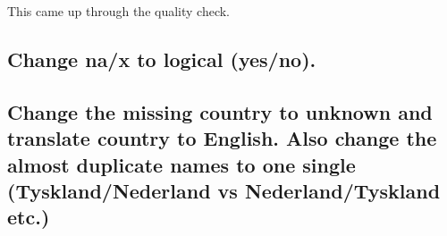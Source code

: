 \documentclass[]{article}
\newenvironment{Shaded}{\begin{snugshade}}{\end{snugshade}}
\newcommand{\CommentTok}[1]{\textcolor[rgb]{0.56,0.35,0.01}{\textit{#1}}}
\newcommand{\DataTypeTok}[1]{\textcolor[rgb]{0.13,0.29,0.53}{#1}}
\newcommand{\KeywordTok}[1]{\textcolor[rgb]{0.13,0.29,0.53}{\textbf{#1}}}
\newcommand{\NormalTok}[1]{#1}
\newcommand{\OperatorTok}[1]{\textcolor[rgb]{0.81,0.36,0.00}{\textbf{#1}}}
\newcommand{\OtherTok}[1]{\textcolor[rgb]{0.56,0.35,0.01}{#1}}
\newcommand{\StringTok}[1]{\textcolor[rgb]{0.31,0.60,0.02}{#1}}
\begin{document}
This came up through the quality check.

\hypertarget{change-nax-to-logical-yesno.}{%
\subsection{Change na/x to logical
(yes/no).}\label{change-nax-to-logical-yesno.}}

\begin{Shaded}
\end{Shaded}

\hypertarget{change-the-missing-country-to-unknown-and-translate-country-to-english.-also-change-the-almost-duplicate-names-to-one-single-tysklandnederland-vs-nederlandtyskland-etc.}{%
\subsection{Change the missing country to unknown and translate country
to English. Also change the almost duplicate names to one single
(Tyskland/Nederland vs Nederland/Tyskland
etc.)}\label{change-the-missing-country-to-unknown-and-translate-country-to-english.-also-change-the-almost-duplicate-names-to-one-single-tysklandnederland-vs-nederlandtyskland-etc.}}
\end{document}
